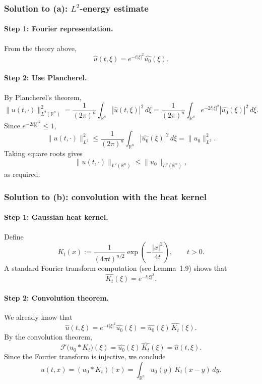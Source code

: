 \documentclass[12pt,a4paper]{article}
\theoremstyle{plain}
\theoremstyle{definition}
\theoremstyle{remark}
\theoremstyle{remark}
\begin{document}
\bigskip
\subsubsection*{Solution to (a): \(L^2\)-energy estimate}

\paragraph{\textbf{Step 1: Fourier representation.}}
From the theory above,
\[
\widehat{u}(t,\xi)
= e^{-t|\xi|^2} \widehat{u_0}(\xi).
\]

\paragraph{\textbf{Step 2: Use Plancherel.}}
By Plancherel's theorem,
\[
\|u(t,\cdot)\|_{L^2(\mathbb{R}^n)}^2
= \frac{1}{(2\pi)^n} \int_{\mathbb{R}^n}
|\widehat{u}(t,\xi)|^2\,d\xi
= \frac{1}{(2\pi)^n} \int_{\mathbb{R}^n}
e^{-2t|\xi|^2} |\widehat{u_0}(\xi)|^2\,d\xi.
\]
Since \(e^{-2t|\xi|^2} \le 1\),
\[
\|u(t,\cdot)\|_{L^2}^2
\le \frac{1}{(2\pi)^n} \int_{\mathbb{R}^n}
|\widehat{u_0}(\xi)|^2\,d\xi
= \|u_0\|_{L^2}^2.
\]
Taking square roots gives
\[
\|u(t,\cdot)\|_{L^2(\mathbb{R}^n)}
\le \|u_0\|_{L^2(\mathbb{R}^n)},
\]
as required.

\bigskip
\subsubsection*{Solution to (b): convolution with the heat kernel}

\paragraph{\textbf{Step 1: Gaussian heat kernel.}}
Define
\[
K_t(x)
:= \frac{1}{(4\pi t)^{n/2}} \exp\!\left(-\frac{|x|^2}{4t}\right),
\qquad t>0.
\]
A standard Fourier transform computation (see Lemma~1.9) shows that
\[
\widehat{K_t}(\xi) = e^{-t|\xi|^2}.
\]

\paragraph{\textbf{Step 2: Convolution theorem.}}
We already know that
\[
\widehat{u}(t,\xi)
= e^{-t|\xi|^2} \widehat{u_0}(\xi)
= \widehat{u_0}(\xi)\,\widehat{K_t}(\xi).
\]
By the convolution theorem,
\[
\mathcal{F}\bigl(u_0 * K_t\bigr)(\xi)
= \widehat{u_0}(\xi)\,\widehat{K_t}(\xi)
= \widehat{u}(t,\xi).
\]
Since the Fourier transform is injective, we conclude
\[
u(t,x) = (u_0 * K_t)(x)
= \int_{\mathbb{R}^n} u_0(y)\,K_t(x-y)\,dy.
\]
\end{document}
